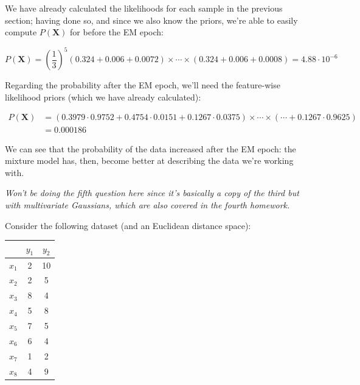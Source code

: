 \documentclass[12pt]{article}
\begin{document}
\begin{enumerate}[leftmargin=\labelsep]
  We have already calculated the likelihoods for each sample in the previous section;
  having done so, and since we also know the priors, we're able to easily
  compute $P(\mathbf{X})$ for before the EM epoch:

  \begin{equation*}
    P(\mathbf{X}) = \left(\frac{1}{3}\right)^5 (0.324 +  0.006 +  0.0072) \times \cdots \times (0.324 +  0.006 +  0.0008)
    = 4.88 \cdot 10^{-6}
  \end{equation*}

  Regarding the probability after the EM epoch, we'll need the feature-wise likelihood
  priors (which we have already calculated):

  \begin{equation*}
    \begin{aligned}
      P(\mathbf{X}) & = (0.3979 \cdot 0.9752 + 0.4754 \cdot 0.0151 + 0.1267 \cdot 0.0375) \times \cdots \times (\cdots + 0.1267 \cdot 0.9625) \\
                    & = 0.000186
    \end{aligned}
  \end{equation*}

  We can see that the probability of the data increased after the EM epoch: the mixture
  model has, then, become better at describing the data we're working with.

  \textit{Won't be doing the fifth question here since it's basically a copy of the
    third but with multivariate Gaussians, which are also covered in the fourth homework.}

  \begin{tcolorbox}[enhanced jigsaw,halign=center,colback=bg,boxrule=0pt,arc=1pt]

    \item Consider the following dataset (and an Euclidean distance space):

    \begin{table}[H]
      \centering
      \begin{tabular}{c|c|c}
              & $y_1$ & $y_2$ \\ \hline
        $x_1$ & 2     & 10    \\
        $x_2$ & 2     & 5     \\
        $x_3$ & 8     & 4     \\
        $x_4$ & 5     & 8     \\
        $x_5$ & 7     & 5     \\
        $x_6$ & 6     & 4     \\
        $x_7$ & 1     & 2     \\
        $x_8$ & 4     & 9     \\
      \end{tabular}
    \end{table}


\end{tcolorbox}
\end{enumerate}
\end{document}
